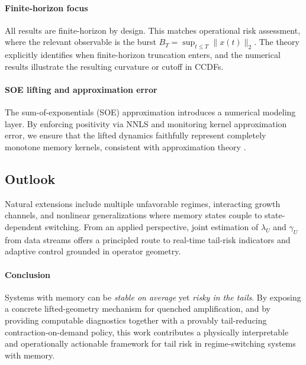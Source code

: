 \documentclass[12pt,a4paper]{article}
\theoremstyle{definition}
\theoremstyle{remark}
\begin{document}
\paragraph{Finite-horizon focus}
All results are finite-horizon by design.
This matches operational risk assessment, where the relevant observable is the burst
$B_T=\sup_{t\le T}\|x(t)\|_2$.
The theory explicitly identifies when finite-horizon truncation enters,
and the numerical results illustrate the resulting curvature or cutoff in CCDFs.

\paragraph{SOE lifting and approximation error}
The sum-of-exponentials (SOE) approximation introduces a numerical modeling layer.
By enforcing positivity via NNLS and monitoring kernel approximation error,
we ensure that the lifted dynamics faithfully represent completely monotone memory kernels,
consistent with approximation theory
\cite{beylkinMonzon2005expSums,gripenberg1990volterra,pruss1993evolution}.

\subsection*{Outlook}

Natural extensions include multiple unfavorable regimes,
interacting growth channels, and nonlinear generalizations
where memory states couple to state-dependent switching.
From an applied perspective, joint estimation of
$\lambda_U$ and $\gamma_U$ from data streams
offers a principled route to real-time tail-risk indicators
and adaptive control grounded in operator geometry.

\paragraph{Conclusion}
Systems with memory can be \emph{stable on average} yet \emph{risky in the tails}.
By exposing a concrete lifted-geometry mechanism for quenched amplification,
and by providing computable diagnostics together with a provably tail-reducing
contraction-on-demand policy,
this work contributes a physically interpretable and operationally actionable
framework for tail risk in regime-switching systems with memory.

\appendix
\end{document}
